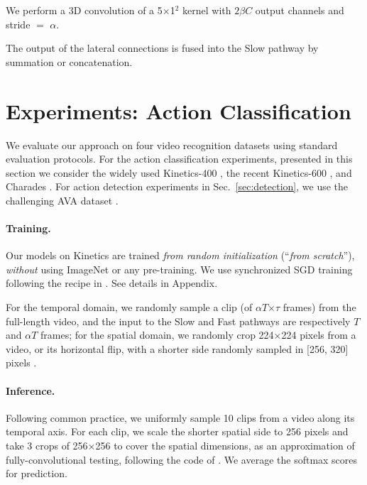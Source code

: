 \documentclass[10pt,twocolumn,letterpaper]{article}
\newcommand{\sref}[1]{Sec.~\ref{#1}}
\def\x{$\times$}
\renewcommand{\omega}{\alpha}
\renewcommand{\phi}{\beta}
\begin{document}
	\vspace{.5em}
	 We perform a 3D convolution of a 5\x1$^\text{2}$ kernel with $2\phi C$ output channels and stride $=$ $\omega$.
	
	\vspace{.5em}
	\noindent
	The output of the lateral connections is fused into the Slow pathway by summation or concatenation.
	
	\section{Experiments: Action Classification} \label{sec:kinetics}
	
	We evaluate our approach on four video recognition datasets using standard evaluation protocols. For the action classification experiments, presented in this section we consider the widely used Kinetics-400  \cite{Kay2017}, the recent Kinetics-600 \cite{Carreira2018}, and Charades \cite{Sigurdsson2016}. For action detection experiments in \sref{sec:detection}, we use the challenging AVA dataset \cite{Gu2018}. 
	
		\paragraph{Training.} Our models on Kinetics are trained \emph{from random initialization} (``\emph{from scratch}''), \emph{without} using ImageNet \cite{Deng2009} or any pre-training. We use synchronized SGD training following the recipe in \cite{Goyal2017}. See details in Appendix.
	
	For the temporal domain, we randomly sample a clip (of $\alpha T$\x$\tau$ frames) from the full-length video, and the input to the Slow and Fast pathways are respectively $T$ and $\omega T$ frames; for the spatial domain, we randomly crop 224\x224 pixels from a video, or its horizontal flip, with a shorter side randomly sampled in [256, 320] pixels \cite{Simonyan2015,Wang2018}. 
 
	\paragraph{Inference.}  Following common practice, we uniformly sample 10 clips from a video along its temporal axis.
	For each clip, we scale the shorter spatial side to 256 pixels and take 3 crops of 256\x256 to cover the spatial dimensions, as an approximation of fully-convolutional testing, following the code of \cite{Wang2018}. We average the softmax scores for prediction.
	
\end{document}
